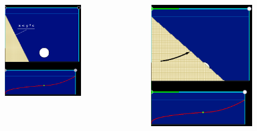 \documentclass{beamer}
\begin{document}
\begin{frame}
	\begin{columns}
		\begin{column}{0.5\textwidth}
			\begin{figure}
				\centering
			\includegraphics[width=0.9\textwidth]{images/arc1.png}	
			\end{figure}		
	    \end{column}
\begin{column}{0.5\textwidth}
	\begin{figure}
		\centering
		\includegraphics[width=0.9\textwidth]{images/arc3.png}	

\end{figure}
\end{column}
\end{columns}
\end{frame}
\end{document}
